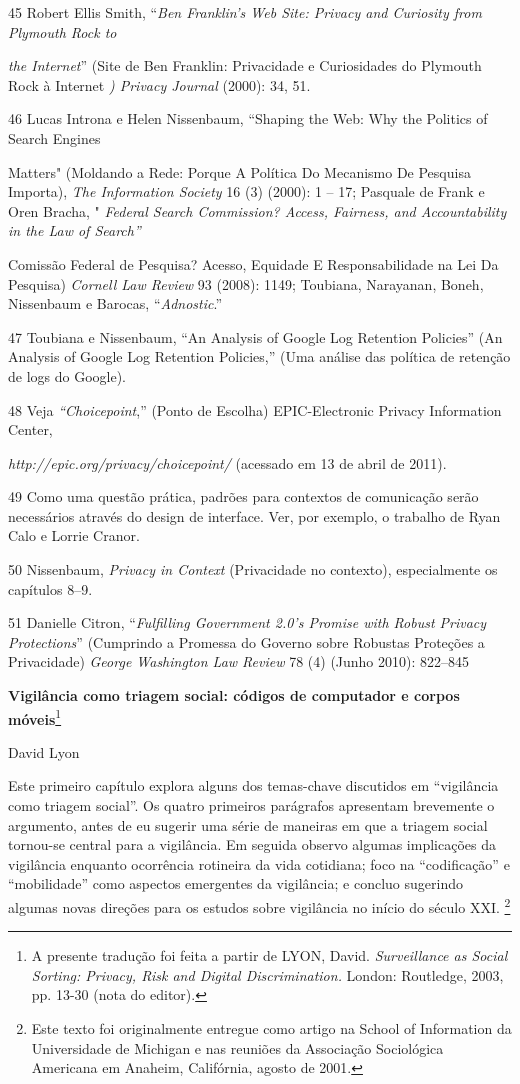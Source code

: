 45 Robert Ellis Smith, ``\emph{Ben Franklin's Web Site: Privacy and
Curiosity from Plymouth Rock to}

\emph{the Internet}'' (Site de Ben Franklin: Privacidade e Curiosidades
do Plymouth Rock à Internet \emph{) Privacy Journal} (2000): 34, 51.

46 Lucas Introna e Helen Nissenbaum, ``Shaping the Web: Why the Politics
of Search Engines

Matters" (Moldando a Rede: Porque A Política Do Mecanismo De Pesquisa
Importa), \emph{The Information Society} 16 (3) (2000): 1 -- 17;
Pasquale de Frank e Oren Bracha, " \emph{Federal Search Commission?
Access, Fairness, and Accountability in the Law of Search''}

Comissão Federal de Pesquisa? Acesso, Equidade E Responsabilidade na Lei
Da Pesquisa) \emph{Cornell Law Review} 93 (2008): 1149; Toubiana,
Narayanan, Boneh, Nissenbaum e Barocas, ``\emph{Adnostic}.''

47 Toubiana e Nissenbaum, ``An Analysis of Google Log Retention
Policies'' (An Analysis of Google Log Retention Policies,'' (Uma análise
das política de retenção de logs do Google).

48 Veja \emph{``Choicepoint},'' (Ponto de Escolha) EPIC-Electronic
Privacy Information Center,

\emph{http://epic.org/privacy/choicepoint/}
(acessado em 13 de abril de 2011).

49 Como uma questão prática, padrões para contextos de comunicação serão
necessários através do design de interface. Ver, por exemplo, o trabalho
de Ryan Calo e Lorrie Cranor.

50 Nissenbaum, \emph{Privacy in Context} (Privacidade no contexto),
especialmente os capítulos 8--9.

51 Danielle Citron, ``\emph{Fulfilling Government 2.0's Promise with
Robust Privacy Protections}'' (Cumprindo a Promessa do Governo sobre
Robustas Proteções a Privacidade) \emph{George Washington Law Review} 78
(4) (Junho 2010): 822--845

\textbf{Vigilância como triagem social: códigos de computador e corpos
móveis}\footnote{A presente tradução foi feita a partir de LYON, David.
  \emph{Surveillance as Social Sorting: Privacy, Risk and Digital
  Discrimination.} London: Routledge, 2003, pp. 13-30 (nota do editor).}

David Lyon

Este primeiro capítulo explora alguns dos temas-chave discutidos em
``vigilância como triagem social''. Os quatro primeiros parágrafos
apresentam brevemente o argumento, antes de eu sugerir uma série de
maneiras em que a triagem social tornou-se central para a vigilância. Em
seguida observo algumas implicações da vigilância enquanto ocorrência
rotineira da vida cotidiana; foco na ``codificação'' e ``mobilidade''
como aspectos emergentes da vigilância; e concluo sugerindo algumas
novas direções para os estudos sobre vigilância no início do século XXI.
\footnote{Este texto foi originalmente entregue como artigo na School of
  Information da Universidade de Michigan e nas reuniões da Associação
  Sociológica Americana em Anaheim, Califórnia, agosto de 2001.}

